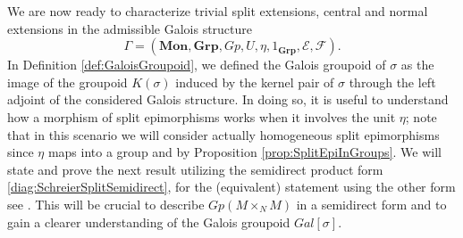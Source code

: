 We are now ready to characterize trivial split extensions, central and normal extensions in the admissible Galois structure
\[ \Gamma = (\textbf{Mon}, \textbf{Grp}, Gp, U, \eta, 1_{\textbf{Grp}}, \mathscr{E}, \mathscr{F}). \]
In Definition \ref{def:GaloisGroupoid}, we defined the Galois groupoid of $\sigma$ as the image of the groupoid $K(\sigma)$ induced by the kernel pair of $\sigma$ through the left adjoint of the considered Galois structure. In doing so, it is useful to understand how a morphism of split epimorphisms works when it involves the unit $\eta$; note that in this scenario we will consider actually homogeneous split epimorphisms since $\eta$ maps into a group and by Proposition \ref{prop:SplitEpiInGroups}. We will state and prove the next result utilizing the semidirect product form \eqref{diag:SchreierSplitSemidirect}, for the (equivalent) statement using the other form see \cite{montoli2014galois}. This will be crucial to describe $Gp(M\times_NM)$ in a semidirect form and to gain a clearer understanding of the Galois groupoid $Gal[\sigma]$.
